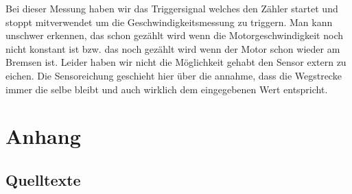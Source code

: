 \documentclass[12pt]{article}
\begin{document}
Bei dieser Messung haben wir das Triggersignal welches den Zähler startet und stoppt mitverwendet um die Geschwindigkeitsmessung zu triggern.
Man kann unschwer erkennen, das schon gezählt wird wenn die Motorgeschwindigkeit noch nicht konstant ist bzw. das noch gezählt wird wenn der Motor schon wieder am Bremsen ist. Leider haben wir nicht die Möglichkeit gehabt den Sensor extern zu eichen. Die Sensoreichung geschieht hier über die annahme, dass
die Wegstrecke immer die selbe bleibt und auch wirklich dem eingegebenen Wert entspricht.

\section{Anhang}

\subsection{Quelltexte}






\end{document}
